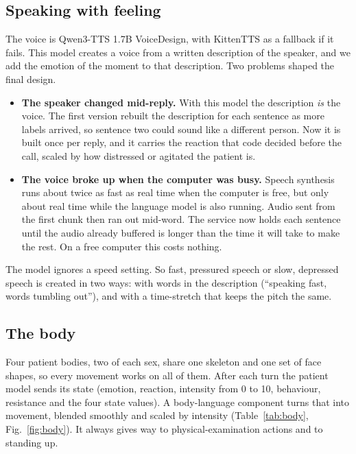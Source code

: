 \documentclass{article}
\begin{document}
\subsection{Speaking with feeling}
The voice is Qwen3-TTS 1.7B VoiceDesign, with KittenTTS as a fallback if it fails. This model creates a voice from a written description of the
speaker, and we add the emotion of the moment to that description. Two problems shaped the final design.
\begin{itemize}
\item \textbf{The speaker changed mid-reply.} With this model the description \emph{is} the voice. The first version rebuilt the description for
each sentence as more labels arrived, so sentence two could sound like a different person. Now it is built once per reply, and it carries the
reaction that code decided before the call, scaled by how distressed or agitated the patient is.
\item \textbf{The voice broke up when the computer was busy.} Speech synthesis runs about twice as fast as real time when the computer is free,
but only about real time while the language model is also running. Audio sent from the first chunk then ran out mid-word. The service now holds
each sentence until the audio already buffered is longer than the time it will take to make the rest. On a free computer this costs nothing.
\end{itemize}
The model ignores a speed setting. So fast, pressured speech or slow, depressed speech is created in two ways: with words in the description (``speaking fast, words tumbling out''), and with a time-stretch that keeps the pitch the same.

\subsection{The body}
Four patient bodies, two of each sex, share one skeleton and one set of face shapes, so every movement works on all of them. After each turn the
patient model sends its state (emotion, reaction, intensity from 0 to 10, behaviour, resistance and the four state values). A body-language
component turns that into movement, blended smoothly and scaled by intensity (Table~\ref{tab:body}, Fig.~\ref{fig:body}). It always gives way to
physical-examination actions and to standing up.
\end{document}
